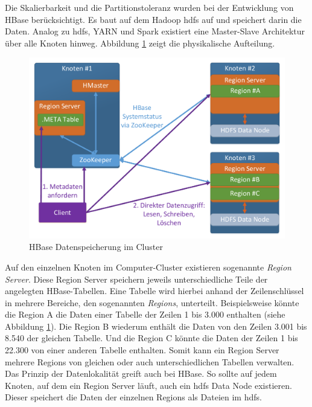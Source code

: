 \noindent
Die Skalierbarkeit und die Partitionstoleranz wurden bei der Entwicklung von HBase berücksichtigt. Es baut auf dem Hadoop \gls{hdfs} auf und speichert darin die Daten. Analog zu \gls{hdfs}, YARN und Spark existiert eine Master-Slave Architektur über alle Knoten hinweg. Abbildung \ref{fig:hbase_cluster_architecture} zeigt die physikalische Aufteilung.\\

\begin{figure}[ht]
  \centering
  \includegraphics[width=\textwidth]{./resource/hbase_cluster_architecture.pdf}
  \caption{HBase Datenspeicherung im Cluster}
  \label{fig:hbase_cluster_architecture}
\end{figure}

\noindent
Auf den einzelnen Knoten im Computer-Cluster existieren sogenannte \textit{Region Server}. Diese Region Server speichern jeweils unterschiedliche Teile der angelegten HBase-Tabellen. 
Eine Tabelle wird hierbei anhand der Zeilenschlüssel in mehrere Bereiche, den sogenannten \textit{Regions}, unterteilt. Beispielsweise könnte die Region A die Daten einer Tabelle der Zeilen 1 bis 3.000 enthalten (siehe Abbildung \ref{fig:hbase_cluster_architecture}). Die Region B wiederum enthält die Daten von den Zeilen 3.001 bis 8.540 der gleichen Tabelle. Und die Region C könnte die Daten der Zeilen 1 bis 22.300 von einer anderen Tabelle enthalten. Somit kann ein Region Server mehrere Regions von gleichen oder auch unterschiedlichen Tabellen verwalten.  Das Prinzip der Datenlokalität greift auch bei HBase. So sollte auf  jedem Knoten, auf dem ein Region Server läuft, auch ein \gls{hdfs} Data Node existieren. Dieser speichert die Daten der einzelnen Regions als Dateien im \gls{hdfs}.\\

